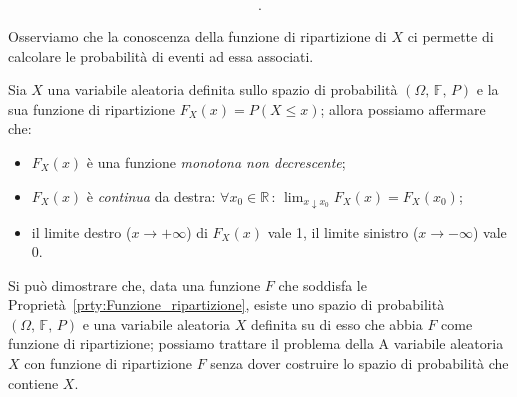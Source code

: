 \begin{obsv}
\begin{enumerate}[\indent (a)]
\begin{align*}
                    .\end{align*}
            \end{enumerate}
            Osserviamo che la conoscenza della funzione di ripartizione di $X$ ci permette di calcolare le probabilità di eventi ad essa associati.
            \begin{prty}\label{prty:Funzione_ripartizione}
                Sia $X$ una variabile aleatoria definita sullo spazio di probabilità $(\Omega,\,\mathbb{F},\,P)$ e la sua funzione di ripartizione $F_X(x) = P(X \leq x)$; allora possiamo affermare che:
                \begin{itemize}
                    \item $F_X(x)$ è una funzione \emph{monotona non decrescente};
                    \item $F_X(x)$ è \emph{continua} da destra: $\forall x_0 \in \mathbb{R} \,:\, \lim_{x \downarrow x_0} F_X(x) = F_X(x_0)$;
                    \item il limite destro ($x \rightarrow +\infty$) di $F_X(x)$ vale 1, il limite sinistro ($x \rightarrow -\infty$) vale 0.
                \end{itemize}
            \end{prty}
            \begin{obsv}
                Si può dimostrare che, data una funzione $F$ che soddisfa le Proprietà~\ref{prty:Funzione_ripartizione}, esiste uno spazio di probabilità $(\Omega,\,\mathbb{F},\,P)$ e una variabile aleatoria $X$ definita su di esso che abbia $F$ come funzione di ripartizione; possiamo trattare il problema della A variabile aleatoria $X$ con funzione di ripartizione $F$ senza dover costruire lo spazio di probabilità che contiene $X$.
            \end{obsv}
        \end{obsv}
